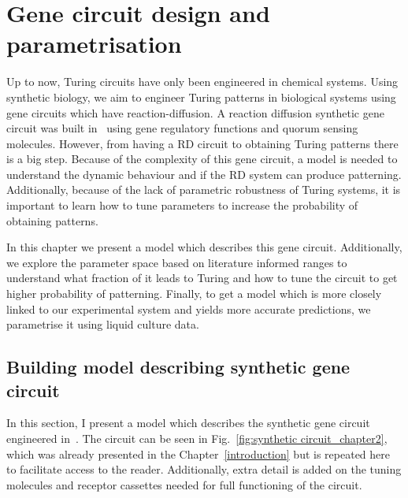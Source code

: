 
\chapter{Gene circuit design and parametrisation} \label{chapter2}
Up to now, Turing circuits have only been engineered in chemical systems.
Using synthetic biology, we aim to engineer Turing patterns in biological systems using gene circuits which have reaction-diffusion.
A reaction diffusion synthetic gene circuit was built in~\cite{Tica2020} using gene regulatory functions and quorum sensing molecules.
However, from having a RD circuit to obtaining Turing patterns there is a big step.
Because of the complexity of this gene circuit, a model is needed to understand the dynamic behaviour and if the RD system can produce patterning.
Additionally, because of the lack of parametric robustness of Turing systems, it is important to learn how to tune parameters to increase the probability of obtaining patterns.

In this chapter we present a model which describes this gene circuit.
Additionally, we explore the parameter space based on literature informed ranges to understand what fraction of it leads to Turing and how to tune the circuit to get higher probability of patterning.
Finally, to get a model which is more closely linked to our experimental system and yields more accurate predictions, we parametrise it using liquid culture data.

\section{Building model describing synthetic gene circuit}
In this section, I present a model which describes the synthetic gene circuit engineered in~\cite{Tica2020}.
The circuit can be seen in Fig.~\ref{fig:synthetic circuit_chapter2}, which was already presented in the Chapter~\ref{introduction} but is repeated here to facilitate access to the reader.
Additionally, extra detail is added on the tuning molecules and receptor cassettes needed for full functioning of the circuit.

